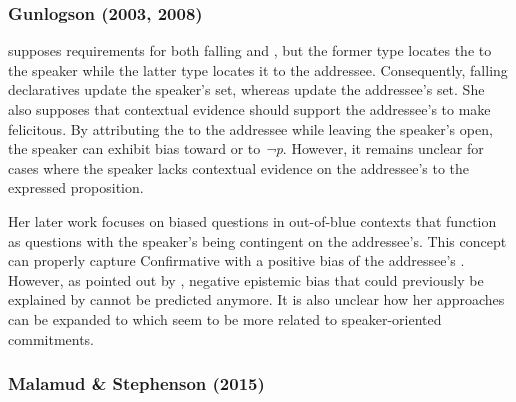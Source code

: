 \documentclass[output=paper,colorlinks,citecolor=brown]{langscibook}
\begin{document}
\subsubsection{Gunlogson (2003, 2008)}
\label{sec:Gunlogson:Hong}

\citet{gunlogson2003true} supposes  requirements for both falling and , but the former type locates the  to the speaker while the latter type locates it to the addressee. Consequently, falling declaratives update the speaker’s  set, whereas  update the addressee’s  set. She also supposes that contextual evidence should support the addressee’s  to make  felicitous. By attributing the  to the addressee while leaving the speaker’s  open, the speaker can exhibit bias toward or  to \textit{¬p}. However, it remains unclear for cases where the speaker lacks contextual evidence on the addressee’s  to the expressed proposition.

Her later work \citep{gunlogson2008question} focuses on biased questions in out-of-blue contexts that function as questions with the speaker’s  being contingent on the addressee’s. This concept can properly capture Confirmative  with a positive bias of the addressee’s . However, as pointed out by \citet{jeong2018intonation}, negative epistemic bias that could previously be explained by \citet{gunlogson2003true} cannot be predicted anymore. It is also unclear how her approaches can be expanded to  which seem to be more related to speaker-oriented commitments.

\subsubsection{Malamud \& Stephenson (2015)}
\label{sec:Malamud:Hong}
\end{document}
